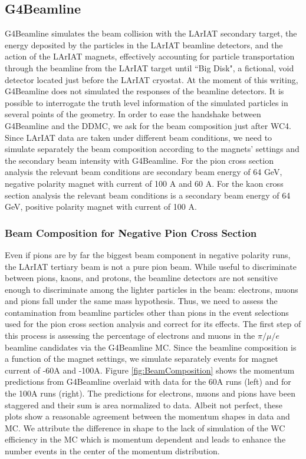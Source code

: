 \subsection{G4Beamline}\label{ch:beamlineComposition}
G4Beamline simulates the beam collision with the LArIAT secondary target, the energy deposited by the particles in the LArIAT beamline detectors, and the action of the LArIAT magnets, effectively accounting for particle transportation through the beamline from the LArIAT target until ``Big Disk", a fictional, void detector located just before the LArIAT cryostat. 
 At the moment of this writing, G4Beamline does not simulated the responses of the beamline detectors. It is possible to interrogate the truth level information of the simulated particles in several points of the geometry. In order to ease the handshake between G4Beamline and the DDMC, we ask for the beam composition just after WC4.
Since LArIAT data are taken under different beam conditions, we need to simulate separately the beam composition according to the magnets' settings and the secondary beam intensity with G4Beamline. For the pion cross section analysis the relevant beam conditions are  secondary beam energy of 64 GeV, negative polarity magnet with current of 100 A and 60 A. For the kaon cross section analysis the relevant beam conditions is a secondary beam energy of 64 GeV, positive polarity magnet with current of 100 A. 

\subsubsection{Beam Composition for Negative Pion Cross Section}
Even if pions are by far the biggest beam component in negative polarity runs, the LArIAT tertiary beam is not a pure pion beam. While useful to discriminate between pions, kaons, and protons, the beamline detectors are not sensitive enough to  discriminate among the lighter particles in the beam: electrons, muons and pions fall under the same mass hypothesis. Thus, we need to assess the contamination from beamline particles other than pions in the event selections used for the pion cross section analysis and correct for its effects. The first step of this process is assessing the percentage of electrons and muons in the $\pi/\mu/e$ beamline candidates via the G4Beamline MC. 
Since the beamline composition is a function of the magnet settings, we simulate separately events for magnet current of -60A and -100A. 
Figure \ref{fig:BeamComposition} shows the momentum predictions from G4Beamline overlaid with data for the 60A runs (left) and for the 100A runs (right). The predictions for electrons, muons and pions have been staggered and their sum is area normalized to data. Albeit not perfect, these plots show a reasonable agreement between the momentum shapes in data and MC. We attribute  the difference in shape to the lack of simulation of the WC efficiency in the MC which is momentum dependent and leads to enhance the number events in the center of the momentum distribution.


